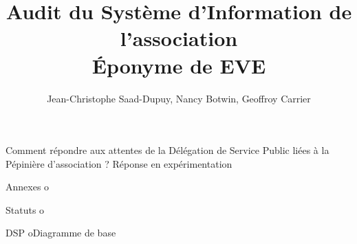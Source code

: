 \documentclass[a4wide,10pt,2pages]{article}
\title{Audit du Système d'Information de l'association \\ \Huge{Éponyme de EVE}}
\author{Jean-Christophe Saad-Dupuy, Nancy Botwin, Geoffroy Carrier}
\begin{document}
\maketitle

\tableofcontents







Comment répondre aux attentes de la Délégation de Service Public liées à la Pépinière d'association ?
            Réponse en expérimentation
	
Annexes
          o

            Statuts
          o

            DSP
          oDiagramme de base
\end{document}

